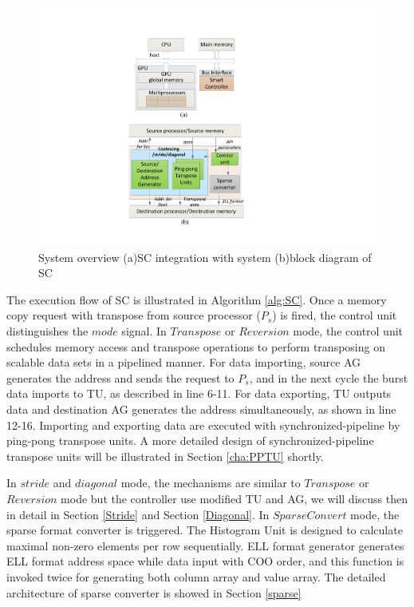 \documentclass[10pt,journal,compsoc]{IEEEtran}
\begin{document}
\begin{figure}[t]
\begin{center}
\graphicspath{{picture/}}

\includegraphics[scale=0.6]{SystemOverview_architecture_v03}

\caption{System overview (a)SC integration with system (b)block diagram of SC}
\label{fig:system}
\end{center}
\end{figure}

The execution flow of SC is illustrated in Algorithm \ref{alg:SC}.
Once a memory copy request with transpose from source processor ($ P_{s} $) is fired, the control unit distinguishes the $ mode $ signal.
In $ Transpose $ or $ Reversion $ mode,
the control unit schedules memory access and transpose operations to perform transposing on scalable data sets in a pipelined manner.
For data importing, source AG generates the address and sends the request to $ P_{s} $, and in the next cycle the burst data imports to TU,
as  described in line 6-11. For data exporting, TU outputs data and destination AG generates the address simultaneously, as shown in line 12-16.
Importing and exporting data are executed with synchronized-pipeline by ping-pong transpose units. A more detailed design of synchronized-pipeline transpose units will be illustrated in Section \ref{cha:PPTU} shortly.

In $stride$ and $diagonal$ mode, the mechanisms are similar to  $ Transpose $ or $ Reversion $ mode but the controller use modified TU and AG, we will discuss then in detail in Section \ref{Stride} and Section \ref{Diagonal}.
In $ SparseConvert $ mode, the sparse format converter is triggered.
The Histogram Unit is designed to calculate maximal non-zero elements per row sequentially. ELL format generator generates
ELL format address space while data input with COO order, and this function is invoked twice for generating both column array and value array. The detailed architecture of sparse converter is showed in Section \ref{sparse}
\end{document}
